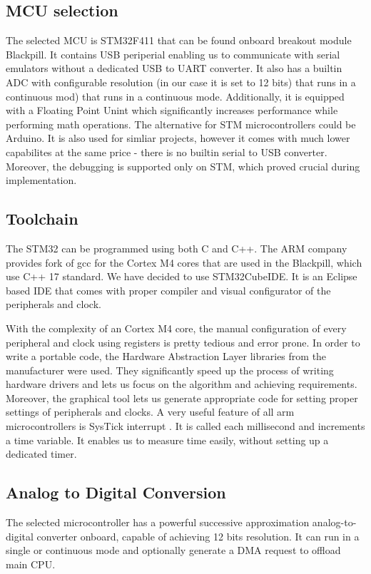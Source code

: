 \documentclass[12pt]{article}
\begin{document}
  \subsection{MCU selection}
  The selected MCU is STM32F411 that can be found onboard breakout module Blackpill. It contains USB periperial enabling us to communicate with serial emulators without a 
  dedicated USB to UART converter. It also has a builtin ADC with configurable resolution (in our case it is set to 12 bits) that runs in a continuous mod) that runs in a continuous mode.
  Additionally, it is equipped with a Floating Point Unint which significantly increases performance while performing math operations.
  The alternative for STM microcontrollers could be Arduino. It is also used for simliar projects, however it comes with much lower capabilites at the same price - there is no builtin serial to USB converter.
  Moreover, the debugging is supported only on STM, which proved crucial during implementation.

  \subsection{Toolchain}
  The STM32 can be programmed using both C and C++. The ARM company provides fork of gcc for the Cortex M4 cores that are used in the Blackpill, which use C++ 17 standard.
  We have decided to use STM32CubeIDE. It is an Eclipse based IDE that comes with proper compiler and visual configurator of the peripherals and clock. 


  With the complexity of an Cortex M4 core, the manual configuration of every peripheral and clock using registers is pretty tedious and error prone. In order to write a portable
  code, the Hardware Abstraction Layer libraries from the manufacturer were used. They significantly speed up the process of writing hardware drivers and lets us focus
  on the algorithm and achieving requirements. Moreover, the graphical tool lets us generate appropriate code for setting proper settings of peripherals and clocks.
  A very useful feature of all arm microcontrollers is SysTick interrupt \cite{stm32reference}. It is called each millisecond and increments a time variable.
  It enables us to measure time easily, without setting up a dedicated timer.

  \subsection{Analog to Digital Conversion}
  The selected microcontroller has a powerful successive approximation analog-to-digital converter onboard, capable of achieving 12 bits resolution.
  It can run in a single or continuous mode and optionally generate a DMA request to offload main CPU.
\end{document}
